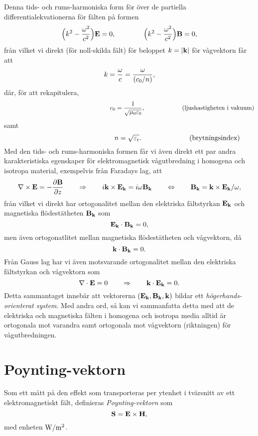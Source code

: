Denna tids- och rums-harmoniska form f{\"o}r {\"o}ver de partiella
differentialekvationerna f{\"o}r f{\"a}lten p{\aa}
formen
$$
  \Big(k^2 - {{\omega^2}\over{c^2}}\Big) {\bf E} = 0,
  \qquad\qquad
  \Big(k^2 - {{\omega^2}\over{c^2}}\Big) {\bf B} = 0,
$$
fr{\aa}n vilket vi direkt (f{\"o}r noll-skilda f{\"a}lt) f{\"o}r beloppet
$k=|{\bf k}|$ f{\"o}r v{\aa}gvektorn f{\aa}r att
$$
  k = {{\omega}\over{c}}
    = {{\omega}\over{(c_0/n)}},
$$
d{\"a}r, f{\"o}r att rekapitulera,
$$
  \hskip100pt\hphantom{ljushastigheten}
  c_0 = {{1}\over{\sqrt{\mu_0\varepsilon_0}}},
  \hskip60pt(\hbox{ljushastigheten i vakuum})
$$
samt
$$
  \hskip69pt\hphantom{brytningsindex}
  n = \sqrt{\varepsilon_{\rm r}}.
  \hskip69pt(\hbox{brytningsindex})
$$
Med den tids- och rums-harmoniska formen f{\aa}r vi {\"a}ven direkt ett par
andra karakteristiska egenskaper f{\"o}r elektromagnetisk v{\aa}gutbredning
i homogena och isotropa material, exempelvis fr{\aa}n Faradays lag, att
$$
  \nabla\times{\bf E}=-{{\partial{\bf B}}\over{\partial z}}
  \qquad\Rightarrow\qquad
  i{\bf k}\times{\bf E}_{\bf k} = i\omega{\bf B}_{\bf k}
  \qquad\Leftrightarrow\qquad
  {\bf B}_{\bf k}={\bf k}\times{\bf E}_{\bf k}/\omega,
$$
fr{\aa}n vilket vi direkt har ortogonalitet mellan den elektriska
f{\"a}ltstyrkan ${\bf E}_{\bf k}$ och magnetiska fl{\"o}des\-t{\"a}t\-heten
${\bf B}_{\bf k}$ som
$$
  {\bf E}_{\bf k}\cdot{\bf B}_{\bf k}=0,
$$
men {\"a}ven ortogonatlitet mellan magnetiska fl{\"o}dest{\"a}theten och
v{\aa}gvektorn, d{\aa}
$$
  {\bf k}\cdot{\bf B}_{\bf k}=0.
$$
Fr{\aa}n Gauss lag
har vi {\"a}ven motsvarande ortogonalitet mellan den elektriska f{\"a}ltstyrkan
och v{\aa}gvektorn som
$$
  \nabla\cdot{\bf E}=0
  \qquad\Rightarrow\qquad
  {\bf k}\cdot{\bf E}_{\bf k}=0.
$$
Detta sammantaget inneb{\"a}r att vektorerna $({\bf E}_{\bf k},{\bf B}_{\bf k},
{\bf k})$ bildar ett {\it h{\"o}gerhands-orienterat system}. Med andra ord,
s{\aa} kan vi sammanfatta detta med att de elektriska och magnetiska f{\"a}lten
i homogena och isotropa media alltid {\"a}r ortogonala mot varandra samt
ortogonala mot v{\aa}gvektorn (riktningen) f{\"o}r v{\aa}gutbredningen.
\smallskip
\centerline{}
\medskip

\section{Poynting-vektorn}
Som ett m{\aa}tt p{\aa} den effekt som transporteras per ytenhet i
tv{\"a}rsnitt av ett elektromagnetiskt f{\"a}lt, definieras
{\it Poynting-vektorn} som
$$
  {\bf S}={\bf E}\times{\bf H},
$$
med enheten ${\rm W}/{\rm m}^2$.
\bye
